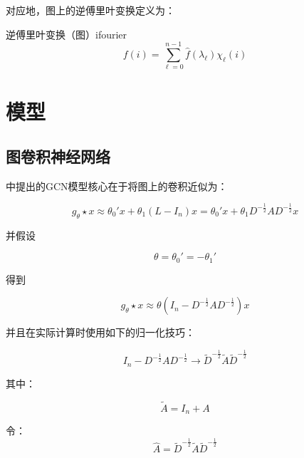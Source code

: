 \documentclass[color=gray,base=hide,cn]{elegantbook}
\begin{document}
对应地，图上的逆傅里叶变换定义为：

\begin{definition}{逆傅里叶变换（图）}{ifourier}
    \begin{equation}
        f(i) = \sum_{\ell=0}^{n-1} \hat{f}(\lambda_{\ell}) \chi_{\ell}(i)
    \end{equation}
\end{definition}

\part{模型}

\chapter{图卷积神经网络}

\cite{kipf2016semi}中提出的GCN模型核心在于将图上的卷积近似为：

\begin{equation}
    g_\theta \star x \approx \theta_0'x + \theta_1 (L-I_n)x =  \theta_0'x + \theta_1 D^{-\frac{1}{2}} A D^{-\frac{1}{2}} x
\end{equation}

并假设

\begin{equation}
    \theta = \theta_0' = -\theta_1'
    \label{eqn:theta}
\end{equation}

得到

\begin{equation}
    g_\theta \star x \approx \theta\left (I_n - D^{-\frac{1}{2}} A D^{-\frac{1}{2}} \right) x
\end{equation}

并且在实际计算时使用如下的归一化技巧：

\begin{equation}
    I_n - D^{-\frac{1}{2}} A D^{-\frac{1}{2}} \rightarrow \tilde{D}^{-\frac{1}{2}} \tilde{A} \tilde{D}^{-\frac{1}{2}}
\end{equation}

其中：

\begin{equation}
    \tilde{A} = I_n + A
\end{equation}

令：
\begin{equation}
    \hat{A} = \tilde{D}^{-\frac{1}{2}}\tilde{A}\tilde{D}^{-\frac{1}{2}}
\end{equation}
\end{document}
